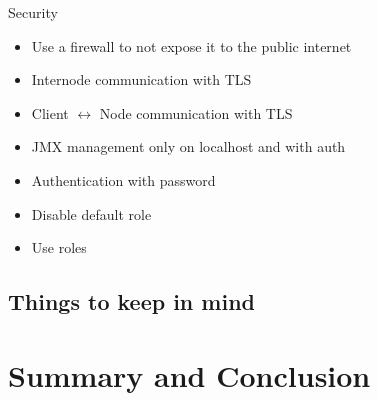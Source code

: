\documentclass[
  10pt
]{beamer}
\begin{document}
\begin{frame}{Security}
  \begin{itemize}
    \item<1-> Use a firewall to not expose it to the public internet
    \item<2-> Internode communication with TLS
    \item<2-> Client $\leftrightarrow$ Node communication with TLS
    \item<3-> JMX management only on localhost and with auth
    \item<4-> Authentication with password
    \item<5-> Disable default role
    \item<5-> Use roles
  \end{itemize}
\end{frame}

\subsection{Things to keep in mind}

\section{Summary and Conclusion}
\end{document}
